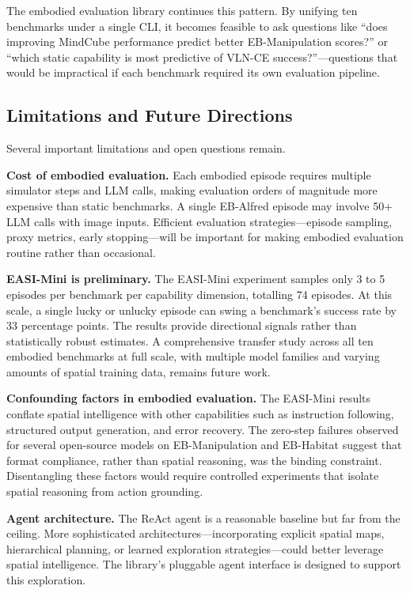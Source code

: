 \documentclass[
hf,
]{confart}
\begin{document}
The embodied evaluation library continues this pattern. By unifying ten benchmarks under a single CLI, it becomes feasible to ask questions like ``does improving MindCube performance predict better EB-Manipulation scores?'' or ``which static capability is most predictive of VLN-CE success?''---questions that would be impractical if each benchmark required its own evaluation pipeline.

\subsection{Limitations and Future Directions}

Several important limitations and open questions remain.

\textbf{Cost of embodied evaluation.} Each embodied episode requires multiple simulator steps and LLM calls, making evaluation orders of magnitude more expensive than static benchmarks. A single EB-Alfred episode may involve 50+ LLM calls with image inputs. Efficient evaluation strategies---episode sampling, proxy metrics, early stopping---will be important for making embodied evaluation routine rather than occasional.

\textbf{EASI-Mini is preliminary.} The EASI-Mini experiment samples only 3 to 5 episodes per benchmark per capability dimension, totalling 74 episodes. At this scale, a single lucky or unlucky episode can swing a benchmark's success rate by 33 percentage points. The results provide directional signals rather than statistically robust estimates. A comprehensive transfer study across all ten embodied benchmarks at full scale, with multiple model families and varying amounts of spatial training data, remains future work.

\textbf{Confounding factors in embodied evaluation.} The EASI-Mini results conflate spatial intelligence with other capabilities such as instruction following, structured output generation, and error recovery. The zero-step failures observed for several open-source models on EB-Manipulation and EB-Habitat suggest that format compliance, rather than spatial reasoning, was the binding constraint. Disentangling these factors would require controlled experiments that isolate spatial reasoning from action grounding.

\textbf{Agent architecture.} The ReAct agent is a reasonable baseline but far from the ceiling. More sophisticated architectures---incorporating explicit spatial maps, hierarchical planning, or learned exploration strategies---could better leverage spatial intelligence. The library's pluggable agent interface is designed to support this exploration.
\end{document}

